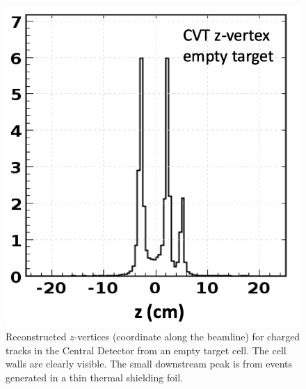 \documentclass[final,3p,twocolumn]{elsarticle}
\begin{document}
\begin{figure}[t!]
\centerline{\includegraphics[width=0.8\columnwidth]{cvt-vertex.png}}
\caption{Reconstructed $z$-vertices (coordinate along the beamline) for charged tracks in the Central Detector
  from an empty target cell. The cell walls are clearly visible. The small downstream peak is from events generated
  in a thin thermal shielding foil.}
\label{cvt-vertex}
\end{figure}
\end{document}
